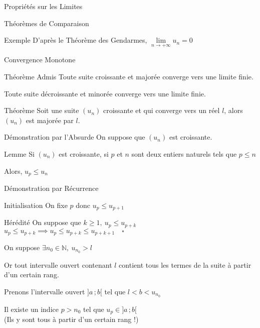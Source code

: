 \documentclass{cours}
\begin{document}
\begin{Gpartie}{Propriétés sur les Limites}
\begin{Spartie}{Théorèmes de Comparaison}
\begin{SSpartie}{Exemple}
                D'après le Théorème des Gendarmes, $\lim\limits_{n\to +\infty}u_n=0$
            \end{SSpartie}
        \end{Spartie}
        \begin{Spartie}{Convergence Monotone} 
            \begin{SSpartie}{Théorème Admis} 
                Toute suite croissante et majorée converge vers une limite finie.

                Toute suite décroissante et minorée converge vers une limite finie.
            \end{SSpartie}
            \begin{SSpartie}{Théorème} 
                Soit une suite $(u_n)$ croissante et qui converge vers un réel $l$, alors $(u_n)$ est majorée par $l$.
            \end{SSpartie}
            \begin{SSpartie}{Démonstration par l'Absurde} 
                On suppose que $(u_n)$ est croissante.
                \begin{SSSpartie}{Lemme} 
                    Si $(u_n)$ est croissante, si $p$ et $n$ sont deux entiers naturels tels que $p\leq n$

                    Alors, $u_p\leq u_n$
                \end{SSSpartie}
                \begin{SSSpartie}{Démonstration par Récurrence}
                    \begin{SSSSpartie}{Initialisation}
                        On fixe $p$ donc $u_p\leq u_{p+1}$
                    \end{SSSSpartie}
                    \begin{SSSSpartie}{Hérédité}
                        On suppose que $k\geq 1,\ u_p\leq u_{p+k}$
                        $u_p\leq u_{p+k}\implies u_p\leq u_{p+k}\leq u_{p+k+1}\quad\square$
                    \end{SSSSpartie}    
                \end{SSSpartie}
                On suppose $\exists n_0\in\mathbb{N},\ u_{n_0}>l$

                Or tout intervalle ouvert contenant $l$ contient tous les termes de la suite à partir d'un certain rang.

                Prenons l'intervalle ouvert $\big]a\,;b\big[$ tel que $l<b<u_{n_0}$

                Il existe un indice $p>n_0$ tel que $u_p\in\big]a\,;b\big[$ \\ (Ils y sont tous à partir d'un certain rang !)


\end{SSpartie}
\end{Spartie}
\end{Gpartie}
\end{document}
